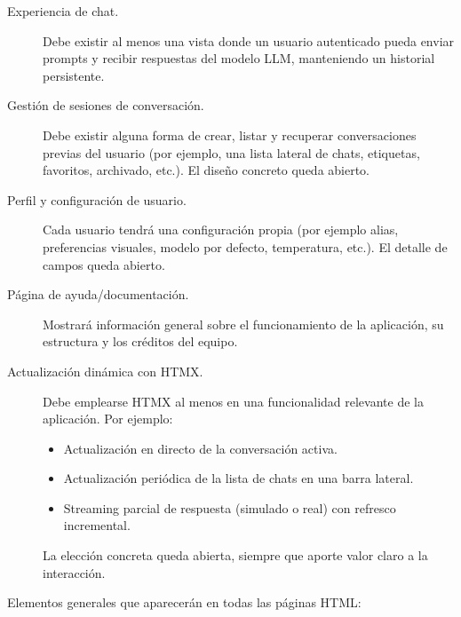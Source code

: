 \begin{description}
\item[Experiencia de chat.] Debe existir al menos una vista donde un usuario autenticado pueda enviar prompts y recibir respuestas del modelo LLM, manteniendo un historial persistente.

\item[Gestión de sesiones de conversación.] Debe existir alguna forma de crear, listar y recuperar conversaciones previas del usuario (por ejemplo, una lista lateral de chats, etiquetas, favoritos, archivado, etc.). El diseño concreto queda abierto.

\item[Perfil y configuración de usuario.] Cada usuario tendrá una configuración propia (por ejemplo alias, preferencias visuales, modelo por defecto, temperatura, etc.). El detalle de campos queda abierto.

\item[Página de ayuda/documentación.] Mostrará información general sobre el funcionamiento de la aplicación, su estructura y los créditos del equipo.

\item[Actualización dinámica con HTMX.] Debe emplearse HTMX al menos en una funcionalidad relevante de la aplicación. Por ejemplo:
\begin{itemize}
\item Actualización en directo de la conversación activa.
\item Actualización periódica de la lista de chats en una barra lateral.
\item Streaming parcial de respuesta (simulado o real) con refresco incremental.
\end{itemize}
La elección concreta queda abierta, siempre que aporte valor claro a la interacción.
\end{description}



Elementos generales que aparecerán en todas las páginas HTML:

